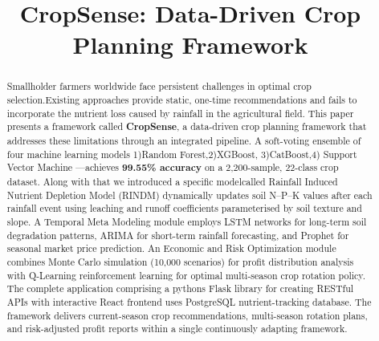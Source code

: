 \documentclass[conference]{IEEEtran}
\begin{document}
\title{CropSense: Data-Driven Crop Planning Framework}

\author{
\vspace{-28pt}
}

\maketitle

\begin{abstract}
Smallholder farmers worldwide face persistent challenges in optimal crop
selection.Existing approaches provide static, one-time recommendations and fails
to incorporate the nutrient loss caused by rainfall in the agricultural field. This paper presents a framework called
\textbf{CropSense}, a data-driven crop planning framework that
addresses these limitations through an integrated pipeline. A soft-voting
ensemble of four machine learning models 1)Random Forest,2)XGBoost,
3)CatBoost,4) Support Vector Machine ---achieves \textbf{99.55\%
accuracy} on a 2,200-sample, 22-class crop dataset. Along with that we introduced a specific modelcalled
Rainfall Induced Nutrient Depletion Model (RINDM) dynamically updates soil
N--P--K values after each rainfall event using leaching and runoff
coefficients parameterised by soil texture and slope. A Temporal Meta
Modeling module employs LSTM networks for long-term soil degradation
patterns, ARIMA for short-term rainfall forecasting, and Prophet for
seasonal market price prediction. An Economic and Risk Optimization module
combines Monte Carlo simulation (10,000 scenarios) for profit distribution
analysis with Q-Learning reinforcement learning for optimal multi-season
crop rotation policy. The complete application comprising a pythons Flask library for 
creating RESTful APIs with interactive React frontend uses
PostgreSQL nutrient-tracking database. The framework delivers
current-season crop recommendations, multi-season rotation plans, and
risk-adjusted profit reports within a single continuously adapting
framework.
\end{abstract}
\end{document}
